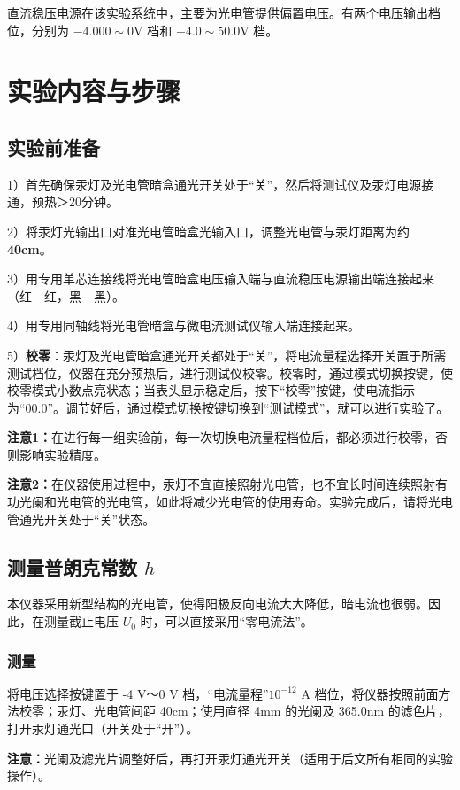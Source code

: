 \documentclass[12pt]{article}
\begin{document}
直流稳压电源在该实验系统中，主要为光电管提供偏置电压。有两个电压输出档位，分别为 $-4.000\sim 0 \mathrm{V}$ 档和 $-4.0\sim 50.0\mathrm {V}$ 档。

\section{实验内容与步骤}

\subsection{实验前准备}
1）首先确保汞灯及光电管暗盒通光开关处于“关”，然后将测试仪及汞灯电源接通，预热＞20分钟。

2）将汞灯光输出口对准光电管暗盒光输入口，调整光电管与汞灯距离为约\textbf{40cm}。

3）用专用单芯连接线将光电管暗盒电压输入端与直流稳压电源输出端连接起来（红—红，黑—黑）。

4）用专用同轴线将光电管暗盒与微电流测试仪输入端连接起来。

5）\textbf{校零}：汞灯及光电管暗盒通光开关都处于“关”，将电流量程选择开关置于所需测试档位，仪器在充分预热后，进行测试仪校零。校零时，通过模式切换按键，使校零模式小数点亮状态；当表头显示稳定后，按下“校零”按键，使电流指示为“00.0”。调节好后，通过模式切换按键切换到“测试模式”，就可以进行实验了。

	\textbf{注意1：}在进行每一组实验前，每一次切换电流量程档位后，都必须进行校零，否则影响实验精度。

	\textbf{注意2：}在仪器使用过程中，汞灯不宜直接照射光电管，也不宜长时间连续照射有功光阑和光电管的光电管，如此将减少光电管的使用寿命。实验完成后，请将光电管通光开关处于“关”状态。


\subsection{测量普朗克常数 $h$}
本仪器采用新型结构的光电管，使得阳极反向电流大大降低，暗电流也很弱。因此，在测量截止电压 $U_0$ 时，可以直接采用“零电流法”。

\subsubsection{测量}
将电压选择按键置于 -4 V～0 V 档，“电流量程”$10^{-12}$ A 档位，将仪器按照前面方法校零；汞灯、光电管间距 40cm；使用直径 4mm 的光阑及 365.0nm 的滤色片，打开汞灯通光口（开关处于“开”）。

	\textbf{注意：}光阑及滤光片调整好后，再打开汞灯通光开关（适用于后文所有相同的实验操作）。
\end{document}
